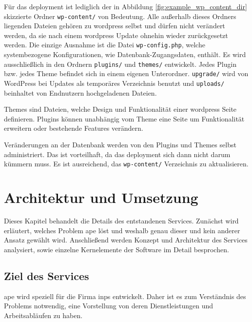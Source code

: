 Für das \gls{deployment} ist lediglich der in Abbildung \ref{fig:example_wp_content_dir} skizzierte Ordner \lstinline!wp-content/! von Bedeutung. Alle außerhalb dieses Ordners liegenden Dateien gehören zu \gls{wordpress} selbst und dürfen nicht verändert werden, da sie nach einem \gls{wordpress} Update ohnehin wieder zurückgesetzt werden. Die einzige Ausnahme ist die Datei \lstinline!wp-config.php!, welche systembezogene Konfigurationen, wie Datenbank-Zugangsdaten, enthält. Es wird ausschließlich in den Ordnern \lstinline!plugins/! und \lstinline!themes/! entwickelt. Jedes Plugin bzw. jedes Theme befindet sich in einem eigenen Unterordner. \lstinline!upgrade/! wird von WordPress bei Updates als temporäres Verzeichnis benutzt und \lstinline!uploads/! beinhaltet von Endnutzern hochgeladenen Dateien.

Themes sind Dateien, welche Design und Funktionalität einer \gls{wordpress} Seite definieren. Plugins können unabhängig vom Theme eine Seite um Funktionalität erweitern oder bestehende Features verändern.

Veränderungen an der Datenbank werden von den Plugins und Themes selbst administriert. Das ist vorteilhaft, da das \gls{deployment} sich dann nicht darum kümmern muss. Es ist ausreichend, das \lstinline!wp-content/! Verzeichnis zu aktualisieren.




\section{Architektur und Umsetzung} %
\label{sec:architektur_und_umsetzung}

Dieses Kapitel behandelt die Details des entstandenen Services. Zunächst wird erläutert, welches Problem \gls{ape} löst und weshalb genau dieser und kein anderer Ansatz gewählt wird. Anschließend werden Konzept und Architektur des Services analysiert, sowie einzelne Kernelemente der Software im Detail besprochen.

\subsection{Ziel des Services} %
\label{sub:ziel_des_services}

\gls{ape} wird speziell für die Firma \gls{inps} entwickelt. Daher ist es zum Verständnis des Problems notwendig, eine Vorstellung von deren Dienstleistungen und Arbeitsabläufen zu haben.

